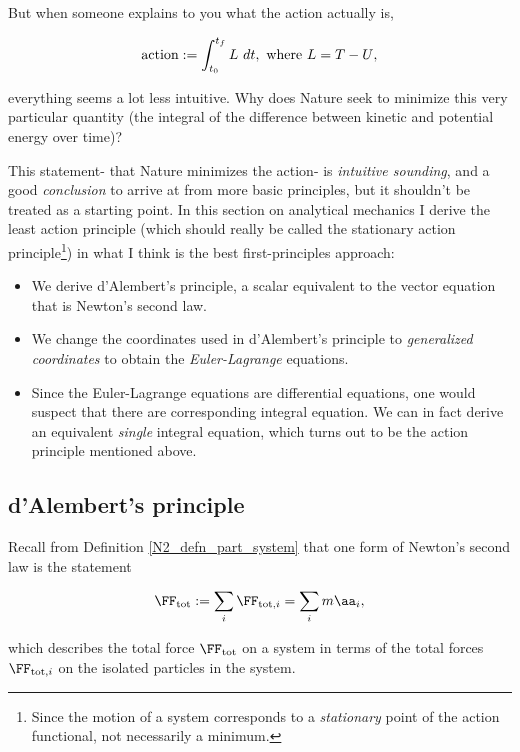 \documentclass{article}
\begin{document}
But when someone explains to you what the action actually is,

\begin{align*}
    \text{action} := \int_{t_0}^{t_f} L \text{ } dt, \text{ where $L = T - U$},
\end{align*}

everything seems a lot less intuitive. Why does Nature seek to minimize this very particular quantity (the integral of the difference between kinetic and potential energy over time)? 

This statement- that Nature minimizes the action- is \textit{intuitive sounding}, and a good \textit{conclusion} to arrive at from more basic principles, but it shouldn't be treated as a starting point. In this section on analytical mechanics I derive the least action principle (which should really be called the stationary action principle\footnote{Since the motion of a system corresponds to a \textit{stationary} point of the action functional, not necessarily a minimum.}) in what I think is the best first-principles approach:

\begin{itemize}
    \item We derive d'Alembert's principle, a scalar equivalent to the vector equation that is Newton's second law.
    \item We change the coordinates used in d'Alembert's principle to \textit{generalized coordinates} to obtain the \textit{Euler-Lagrange} equations.
    \item Since the Euler-Lagrange equations are differential equations, one would suspect that there are corresponding integral equation. We can in fact derive  an equivalent \textit{single} integral equation, which turns out to be the action principle mentioned above.
\end{itemize}

\subsection*{d'Alembert's principle}

Recall from Definition \ref{N2_defn_part_system} that one form of Newton's second law is the statement

\begin{align*}
    \FF_{\text{tot}} := \sum_i \FF_{\text{tot}, i} = \sum_i m \aa_i,
\end{align*}

which describes the total force $\FF_{\text{tot}}$ on a system in terms of the total forces $\FF_{\text{tot}, i}$ on the isolated particles in the system.
\end{document}
